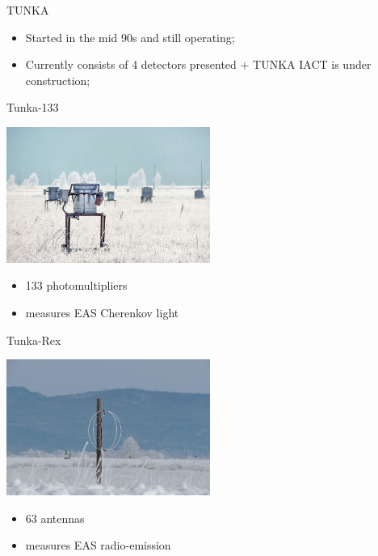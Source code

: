 \begin{frame}{TUNKA}
\footnotesize
\begin{itemize}
 \item Started in the mid 90s and still operating;
 \item Currently consists of 4 detectors presented + TUNKA IACT is under construction;
\end{itemize}
\vspace{-2em}
\begin{minipage}[t]{0.48\textwidth}
  \begin{block}{Tunka-133}
    \parbox[c][0.22\textheight][t]{0.43\textwidth}{
      \includegraphics[width=0.50\textwidth]{pics/Tunka-133.jpg}
    }
    \hfill
    \parbox[c][0.22\textheight][t]{0.55\textwidth}{
      \begin{itemize}
        \setlength{\itemsep}{0pt}
        \item 133 photomultipliers
        \item measures EAS Cherenkov light
      \end{itemize}
    }
  \end{block}
\end{minipage}
\hfill
\begin{minipage}[t]{0.48\textwidth}
  \begin{block}{Tunka-Rex}
    \parbox[c][0.22\textheight][t]{0.43\textwidth}{
      \includegraphics[width=0.50\textwidth]{pics/Tunka-Rex.jpg}
    }
    \hfill
    \parbox[c][0.22\textheight][t]{0.55\textwidth}{
      \begin{itemize}
        \setlength{\itemsep}{0pt}
        \item 63 antennas
        \item measures EAS radio-emission
      \end{itemize}
    }
  \end{block}
\end{minipage}


\end{frame}
